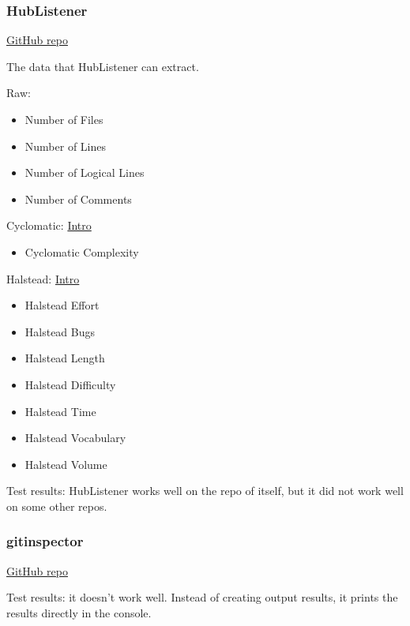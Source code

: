 \documentclass[letterpaper,cleveref]{lipics-v2019}
\theoremstyle{definition}
\begin{document}
\subsubsection{HubListener}
\href{https://github.com/pjmc-oliveira/HubListener}{GitHub repo}

The data that HubListener can extract.

Raw:
\begin{itemize}
\item Number of Files
\item Number of Lines
\item Number of Logical Lines
\item Number of Comments
\end{itemize}

Cyclomatic:
\href{https://www.geeksforgeeks.org/cyclomatic-complexity/}{Intro}
\begin{itemize}
\item Cyclomatic Complexity
\end{itemize}
 
Halstead:
\href{https://www.geeksforgeeks.org/software-engineering-halsteads-software-metrics/}{Intro}
\begin{itemize}
\item Halstead Effort
\item Halstead Bugs
\item Halstead Length
\item Halstead Difficulty
\item Halstead Time
\item Halstead Vocabulary
\item Halstead Volume
\end{itemize}

Test results: HubListener works well on the repo of itself, but it did not work
well on some other repos.

\subsubsection{gitinspector}
\href{https://github.com/ejwa/gitinspector}{GitHub repo}

Test results: it doesn't work well. Instead of creating output results, it
prints the results directly in the console.
\end{document}
